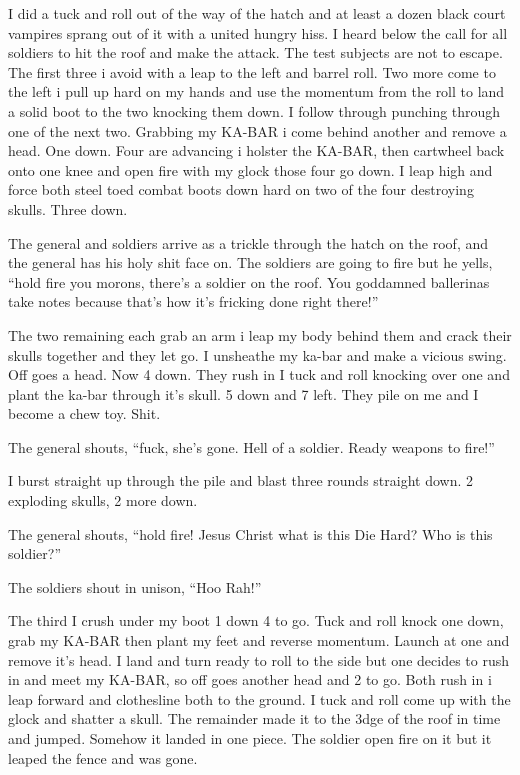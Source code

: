 I did a tuck and roll out of the way of the hatch and at least a dozen black court vampires sprang out of it with a united hungry hiss. I heard below the call for all soldiers to hit the roof and make the attack. The test subjects are not to escape. The first three i avoid with a leap to the left and barrel roll. Two more come to the left i pull up hard on my hands and use the momentum from the roll to land a solid boot to the two knocking them down. I follow through punching through one of the next two. Grabbing my KA-BAR i come behind another and remove a head. One down. Four are advancing i holster the KA-BAR, then cartwheel back onto one knee and open fire with my glock those four go down. I leap high and force both steel toed combat boots down hard on two of the four destroying skulls. Three down.

The general and soldiers arrive as a trickle through the hatch on the roof, and the general has his holy shit face on. The soldiers are going to fire but he yells, ``hold fire you morons, there's a soldier on the roof. You goddamned ballerinas take notes because that's how it's fricking done right there!''

The two remaining each grab an arm i leap my body behind them and crack their skulls together and they let go. I unsheathe my ka-bar and make a vicious swing. Off goes a head. Now 4 down. They rush in I tuck and roll knocking over one and plant the ka-bar through it's skull. 5 down and 7 left. They pile on me and I become a chew toy. Shit.

The general shouts, ``fuck, she's gone. Hell of a soldier. Ready weapons to fire!''

I burst straight up through the pile and blast three rounds straight down. 2 exploding skulls, 2 more down.

The general shouts, ``hold fire! Jesus Christ what is this Die Hard? Who is this soldier?''

The soldiers shout in unison, ``Hoo Rah!''

The third I crush under my boot 1 down 4 to go. Tuck and roll knock one down, grab my KA-BAR then plant my feet and reverse momentum. Launch at one and remove it's head. I land and turn ready to roll to the side but one decides to rush in and meet my KA-BAR, so off goes another head and 2 to go. Both rush in i leap forward and clothesline both to the ground. I tuck and roll come up with the glock and shatter a skull. The remainder made it to the 3dge of the roof in time and jumped. Somehow it landed in one piece. The soldier open fire on it but it leaped the fence and was gone.

